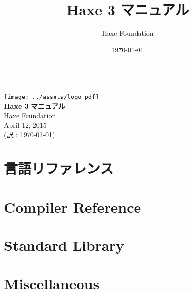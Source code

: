 \documentclass{../haxe}
\renewcommand{\maketitle}{
   \begin{titlepage}
     \setcounter{page}{-1}
			\begin{center}
				~\\[3cm]
				\texttt{[image: ../assets/logo.pdf]}~\\[1cm]
				{\huge \bfseries Haxe 3 マニュアル}\\[7cm]
				Haxe Foundation\\
				April 12, 2015\\
				(訳 : \today)
			\end{center}
   \end{titlepage}
}
\begin{document}
\title{Haxe 3 マニュアル}
\author{Haxe Foundation}
\date{\today}
\maketitle


\clearpage
\todototoc
\listoftodos
\clearpage

\clearpage
\tableofcontents
\clearpage



\part{言語リファレンス}






\part{Compiler Reference}




\part{Standard Library}


\part{Miscellaneous}


\end{document}

